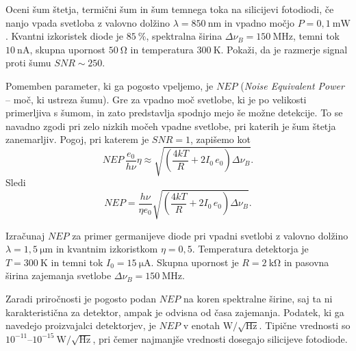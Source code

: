 \begin{definition}
Oceni šum štetja, termični šum in šum temnega toka na silicijevi fotodiodi, če 
nanjo vpada svetloba z valovno dolžino $\lambda=850~\si{\nano\meter}$
in vpadno močjo $P=0,1~\si{\milli\watt}$. Kvantni izkoristek diode je $85~\%$,
spektralna širina $\Delta\nu_B=150~\si{\mega\hertz}$, temni tok $10~\si{\nano\ampere}$,
skupna upornost $50~\si{\ohm}$ in temperatura $300~\si{\kelvin}$. Pokaži, 
da je razmerje signal proti šumu $SNR\sim250$. 
\end{definition}

Pomemben parameter, ki ga pogosto vpeljemo, je $NEP$ ({\it Noise Equivalent Power} -- 
moč, ki ustreza šumu). Gre za vpadno moč svetlobe, ki je po velikosti primerljiva 
s šumom, in zato predstavlja spodnjo mejo še možne detekcije. To se navadno zgodi 
pri zelo nizkih močeh vpadne svetlobe, pri katerih je šum štetja zanemarljiv.
Pogoj, pri katerem je $SNR=1$, zapišemo kot
\begin{equation}
NEP\, \frac{e_0}{h \nu} \eta \approx \sqrt{\left(\frac{4 kT}{R} + 2 I_0\,e_0 \right) \Delta\nu_B}.
\end{equation}
Sledi
\begin{equation}
NEP = \frac{h \nu}{\eta e_0}\sqrt{\left(\frac{4 kT}{R} + 2 I_0\,e_0 \right) \Delta\nu_B}.
\label{NEP}
\end{equation}
\begin{definition}
Izračunaj $NEP$ za primer germanijeve diode pri vpadni svetlobi z valovno dolžino
$\lambda = 1,5~\si{\micro\meter}$ in kvantnim izkoristkom $\eta=0,5$. Temperatura detektorja
je $T=300~\si{\kelvin}$ in temni tok $I_0=15~\si{\micro\ampere}$. Skupna upornost
je $R=2~\si{\kilo\ohm}$ in pasovna širina zajemanja svetlobe
$\Delta\nu_B=150~\si{\mega\hertz}$.
\end{definition}

\begin{remark}
Zaradi priročnosti je pogosto podan $NEP$ na koren spektralne širine, saj ta ni 
karakteristična za detektor, ampak je odvisna od časa zajemanja. Podatek, ki 
ga navedejo proizvajalci detektorjev, je $NEP$ v enotah 
$\si{\watt}/\sqrt{\si{\hertz}}$. Tipične vrednosti so 
$10^{-11}$--$10^{-15}~\si{\watt}/\sqrt{\si{\hertz}}$, pri čemer najmanjše vrednosti
dosegajo silicijeve fotodiode. 
\end{remark}

